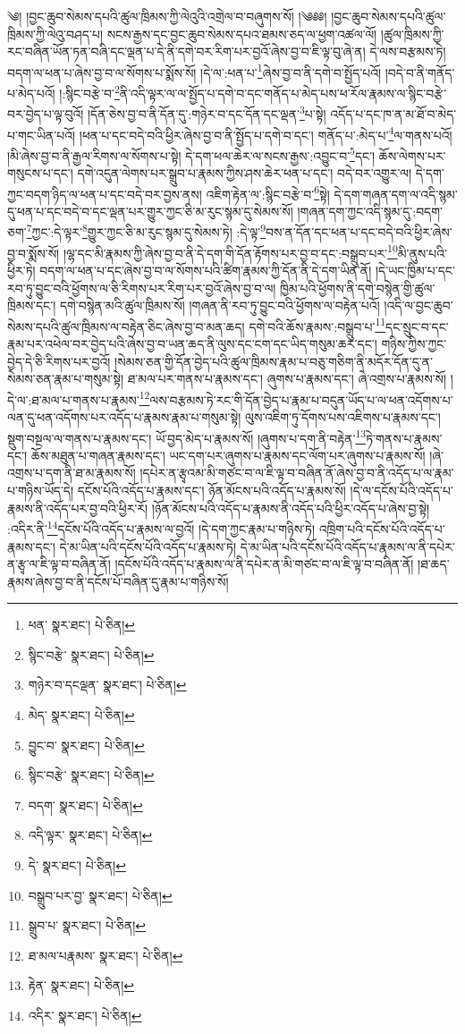 \setcounter{footnote}{0} 
༄། །བྱང་ཆུབ་སེམས་དཔའི་ཚུལ་ཁྲིམས་ཀྱི་ལེའུའི་འགྲེལ་བ་བཞུགས་སོ། །༄༅༅། །བྱང་ཆུབ་སེམས་དཔའི་ཚུལ་ཁྲིམས་ཀྱི་ལེའུ་བཤད་པ། སངས་རྒྱས་དང་བྱང་ཆུབ་སེམས་དཔའ་ཐམས་ཅད་ལ་ཕྱག་འཚལ་ལོ། །ཚུལ་ཁྲིམས་ཀྱི་རང་བཞིན་ཡོན་ཏན་བཞི་དང་ལྡན་པ་དེ་ནི་དགེ་བར་རིག་པར་བྱའོ་ཞེས་བྱ་བ་ཇི་ལྟ་བུ་ཞེ་ན། དེ་ལས་བརྩམས་ཏེ། བདག་ལ་ཕན་པ་ཞེས་བྱ་བ་ལ་སོགས་པ་སྨོས་སོ། །དེ་ལ་:ཕན་པ་\footnote{ཕན་  སྣར་ཐང་།  པེ་ཅིན། }ཞེས་བྱ་བ་ནི་དགེ་བ་སྤྱོད་པའོ། །བདེ་བ་ནི་གནོད་པ་མེད་པའོ། །:སྙིང་བརྩེ་བ་\footnote{སྙིང་བརྩེ་  སྣར་ཐང་།  པེ་ཅིན། }ནི་འདི་ལྟར་ལ་ལ་སྤྱོད་པ་དགེ་བ་དང་གནོད་པ་མེད་པས་ཕ་རོལ་རྣམས་ལ་སྙིང་བརྩེ་བར་བྱེད་པ་ལྟ་བུའོ། །དོན་ཅེས་བྱ་བ་ནི་དོན་དུ་:གཉེར་བ་དང་དོན་དང་ལྡན་\footnote{གཉེར་བ་དངལྡན་  སྣར་ཐང་།  པེ་ཅིན། }པ་སྟེ། འདོད་པ་དང་ཁ་ན་མ་ཐོ་བ་མེད་པ་གང་ཡིན་པའོ། །ཕན་པ་དང་བདེ་བའི་ཕྱིར་ཞེས་བྱ་བ་ནི་སྤྱོད་པ་དགེ་བ་དང་། གནོད་པ་:མེད་པ་\footnote{མེད་  སྣར་ཐང་།  པེ་ཅིན། }ལ་གནས་པའོ། །མི་ཞེས་བྱ་བ་ནི་རྒྱལ་རིགས་ལ་སོགས་པ་སྟེ། དེ་དག་ཕལ་ཆེར་ལ་སངས་རྒྱས་:འབྱུང་བ་\footnote{བྱུང་བ་  སྣར་ཐང་།  པེ་ཅིན། }དང་། ཆོས་ལེགས་པར་གསུངས་པ་དང་། དགེ་འདུན་ལེགས་པར་སྒྲུབ་པ་རྣམས་ཀྱིས་ཤས་ཆེར་ཕན་པ་དང་། བདེ་བར་འགྱུར་ལ། དེ་དག་ཀྱང་བདག་ཉིད་ལ་ཕན་པ་དང་བདེ་བར་བྱས་ནས། འཇིག་རྟེན་ལ་:སྙིང་བརྩེ་བ་\footnote{སྙིང་བརྩེ་  སྣར་ཐང་།  པེ་ཅིན། }སྟེ། དེ་དག་གཞན་དག་ལ་འདི་སྙམ་དུ་ཕན་པ་དང་བདེ་བ་དང་ལྡན་པར་གྱུར་ཀྱང་ཅི་མ་རུང་སྙམ་དུ་སེམས་སོ། །གཞན་དག་ཀྱང་འདི་སྙམ་དུ་:བདག་ཅག་\footnote{བདག་  སྣར་ཐང་།  པེ་ཅིན། }ཀྱང་:དེ་ལྟར་\footnote{འདི་ལྟར་  སྣར་ཐང་།  པེ་ཅིན། }གྱུར་ཀྱང་ཅི་མ་རུང་སྙམ་དུ་སེམས་ཏེ། :དེ་ལྟ་\footnote{དེ་  སྣར་ཐང་།  པེ་ཅིན། }བས་ན་དོན་དང་ཕན་པ་དང་བདེ་བའི་ཕྱིར་ཞེས་བྱ་བ་སྨོས་སོ། །ལྷ་དང་མི་རྣམས་ཀྱི་ཞེས་བྱ་བ་ནི་དེ་དག་གི་དོན་རྟོགས་པར་བྱ་བ་དང་:བསྒྲུབ་པར་\footnote{བསྒྲུབ་པར་བྱ་  སྣར་ཐང་།  པེ་ཅིན། }མི་ནུས་པའི་ཕྱིར་ཏེ། བདག་ལ་ཕན་པ་དང་ཞེས་བྱ་བ་ལ་སོགས་པའི་ཚིག་རྣམས་ཀྱི་དོན་ནི་དེ་དག་ཡིན་ནོ། །དེ་ཡང་ཁྱིམ་པ་དང་རབ་ཏུ་བྱུང་བའི་ཕྱོགས་ལ་ཅི་རིགས་པར་རིག་པར་བྱའོ་ཞེས་བྱ་བ་ལ། ཁྱིམ་པའི་ཕྱོགས་ནི་དགེ་བསྙེན་གྱི་ཚུལ་ཁྲིམས་དང་། དགེ་བསྙེན་མའི་ཚུལ་ཁྲིམས་སོ། །གཞན་ནི་རབ་ཏུ་བྱུང་བའི་ཕྱོགས་ལ་བརྟེན་པའོ། །འདི་ལ་བྱང་ཆུབ་སེམས་དཔའི་ཚུལ་ཁྲིམས་ལ་བརྟེན་ཅིང་ཞེས་བྱ་བ་མན་ཆད། དགེ་བའི་ཆོས་རྣམས་:བསྒྲུབ་པ་\footnote{སྒྲུབ་པ་  སྣར་ཐང་།  པེ་ཅིན། }དང་སྲུང་བ་དང་རྣམ་པར་འཕེལ་བར་བྱེད་པའི་ཞེས་བྱ་བ་ཡན་ཆད་ནི་ལུས་དང་ངག་དང་ཡིད་གསུམ་ཆར་དང་། གཉིས་ཀྱིས་ཀྱང་བྱེད་དེ་ཅི་རིགས་པར་བྱའོ། །སེམས་ཅན་གྱི་དོན་བྱེད་པའི་ཚུལ་ཁྲིམས་རྣམ་པ་བཅུ་གཅིག་ནི་མདོར་དོན་དུ་ན་སེམས་ཅན་རྣམ་པ་གསུམ་སྟེ། ཐ་མལ་པར་གནས་པ་རྣམས་དང་། ཞུགས་པ་རྣམས་དང་། ཞེ་འགྲས་པ་རྣམས་སོ། །དེ་ལ་:ཐ་མལ་པ་གནས་པ་རྣམས་\footnote{ཐ་མལ་པརྣམས་  སྣར་ཐང་།  པེ་ཅིན། }ལས་བརྩམས་ཏེ་རང་གི་དོན་བྱེད་པ་རྣམ་པ་བདུན་ཡོད་པ་ལ་ཕན་འདོགས་པ་ལན་དུ་ཕན་འདོགས་པར་འདོད་པ་རྣམས་རྣམ་པ་གསུམ་སྟེ། ལུས་འཇིག་ཏུ་དོགས་པས་འཇིགས་པ་རྣམས་དང་། སྡུག་བསྔལ་ལ་གནས་པ་རྣམས་དང་། ཡོ་བྱད་མེད་པ་རྣམས་སོ། །ཞུགས་པ་དག་ནི་བརྟེན་\footnote{རྟེན་  སྣར་ཐང་།  པེ་ཅིན། }ཏེ་གནས་པ་རྣམས་དང་། ཆོས་མཐུན་པ་གཞན་རྣམས་དང་། ཡང་དག་པར་ཞུགས་པ་རྣམས་དང་ལོག་པར་ཞུགས་པ་རྣམས་སོ། །ཞེ་འགྲས་པ་དག་ནི་ཐ་མ་རྣམས་སོ། །དཔེར་ན་རྩྭའམ་མི་གཙང་བ་ལ་ཇི་ལྟ་བ་བཞིན་ནོ་ཞེས་བྱ་བ་ནི་འདོད་པ་ལ་རྣམ་པ་གཉིས་ཡོད་དེ། དངོས་པོའི་འདོད་པ་རྣམས་དང་། ཉོན་མོངས་པའི་འདོད་པ་རྣམས་སོ། །དེ་ལ་དངོས་པོའི་འདོད་པ་རྣམས་ནི་འདོད་པར་བྱ་བའི་ཕྱིར་རོ། །ཉོན་མོངས་པའི་འདོད་པ་རྣམས་ནི་འདོད་པའི་ཕྱིར་འདོད་པ་ཞེས་བྱ་སྟེ། :འདིར་ནི་\footnote{འདིར་  སྣར་ཐང་།  པེ་ཅིན། }དངོས་པོའི་འདོད་པ་རྣམས་ལ་བྱའོ། །དེ་དག་ཀྱང་རྣམ་པ་གཉིས་ཏེ། འཁྲིག་པའི་དངོས་པོའི་འདོད་པ་རྣམས་དང་། དེ་མ་ཡིན་པའི་དངོས་པོའི་འདོད་པ་རྣམས་ཏེ། དེ་མ་ཡིན་པའི་དངོས་པོའི་འདོད་པ་རྣམས་ལ་ནི་དཔེར་ན་རྩྭ་ལ་ཇི་ལྟ་བ་བཞིན་ནོ། །དངོས་པོའི་འདོད་པ་རྣམས་ལ་ནི་དཔེར་ན་མི་གཙང་བ་ལ་ཇི་ལྟ་བ་བཞིན་ནོ། །ཐ་ཆད་རྣམས་ཞེས་བྱ་བ་ནི་དངོས་པོ་བཞིན་དུ་རྣམ་པ་གཉིས་སོ། 